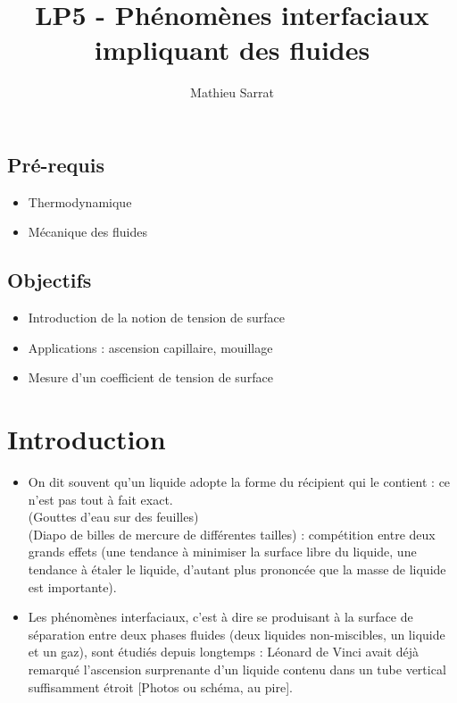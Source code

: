 \documentclass[11pt,a4paper]{report}
\author{Mathieu Sarrat}
\title{LP5 - Phénomènes interfaciaux impliquant des fluides}
\begin{document}
\maketitle

\subsection{Pré-requis}
\begin{itemize}
	\item Thermodynamique
	\item Mécanique des fluides
\end{itemize}

\subsection{Objectifs}
\begin{itemize}
	\item Introduction de la notion de tension de surface
	\item Applications : ascension capillaire, mouillage
	\item Mesure d'un coefficient de tension de surface
\end{itemize}

\newpage
\section*{Introduction}

\begin{itemize}
	\item On dit souvent qu'un liquide adopte la forme du récipient qui le contient : 
	ce n'est pas tout à fait exact.\\ 
	(Gouttes d'eau sur des feuilles)\\
	(Diapo de billes de mercure de différentes tailles) : compétition entre deux grands effets (une tendance à minimiser la surface libre du liquide, une tendance à étaler le liquide, d'autant plus prononcée que la masse de liquide est importante).\\
	
	\item Les phénomènes interfaciaux, c'est à dire se produisant à la surface de séparation entre deux phases fluides (deux liquides non-miscibles, un liquide et un gaz), sont étudiés depuis longtemps : Léonard de Vinci avait déjà remarqué l'ascension surprenante d'un liquide contenu dans un tube vertical suffisamment étroit [Photos ou schéma, au pire].\\ 
\end{itemize}
\end{document}

